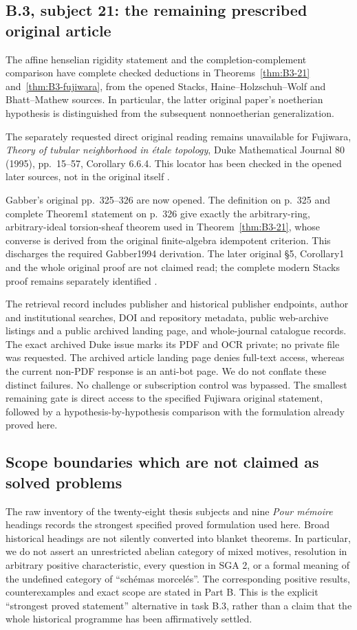 \subsection{B.3, subject 21: the remaining prescribed original article}
The affine henselian rigidity statement and the completion-complement
comparison have complete checked deductions in
Theorems~\ref{thm:B3-21} and~\ref{thm:B3-fujiwara}, from the opened
Stacks, Haine--Holzschuh--Wolf and Bhatt--Mathew sources. In particular,
the latter original paper's noetherian hypothesis is distinguished
from the subsequent nonnoetherian generalization.

The separately requested direct original reading remains unavailable
for Fujiwara, \emph{Theory of tubular neighborhood in
\'etale topology}, Duke Mathematical Journal 80 (1995), pp.~15--57,
Corollary 6.6.4. This locator has been checked in the opened
later sources, not in the original itself \cite{BFujiwara1995}.

Gabber's original pp.~325--326 are now opened. The definition on p.~325
and complete Theorem1 statement on p.~326 give exactly the
arbitrary-ring, arbitrary-ideal torsion-sheaf theorem used in
Theorem~\ref{thm:B3-21}, whose converse is derived from the original
finite-algebra idempotent criterion. This discharges the required
Gabber1994 derivation. The later original \S5, Corollary1 and the
whole original proof are not claimed read; the complete modern Stacks
proof remains separately identified \cite{BGabber1994}.

The retrieval record includes publisher and historical publisher
endpoints, author and institutional searches, DOI and repository
metadata, public web-archive listings and a public archived landing
page, and whole-journal catalogue records. The exact archived Duke
issue marks its PDF and OCR private; no private file was requested.
The archived article landing page denies full-text access, whereas
the current non-PDF response is an anti-bot page. We do not conflate
these distinct failures. No challenge or subscription control was
bypassed. The smallest remaining gate is direct access to the
specified Fujiwara original statement, followed by a
hypothesis-by-hypothesis comparison with the formulation already
proved here.

\subsection{Scope boundaries which are not claimed as solved problems}
The raw inventory of the twenty-eight thesis subjects and nine
\emph{Pour m\'emoire} headings records the strongest specified proved
formulation used here. Broad historical headings are not silently
converted into blanket theorems. In particular, we do not assert an
unrestricted abelian category of mixed motives, resolution in arbitrary
positive characteristic, every question in SGA 2, or a formal meaning
of the undefined category of ``sch\'emas morcel\'es''. The corresponding
positive results, counterexamples and exact scope are stated in Part B.
This is the explicit ``strongest proved statement'' alternative in
task B.3, rather than a claim that the whole historical programme has
been affirmatively settled.

